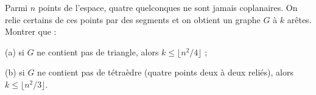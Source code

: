 Parmi $n$ points de l'espace, quatre quelconques ne sont jamais coplanaires. On relie certains de ces points par des segments et on obtient un graphe $G$ à $k$ arêtes. Montrer que :

(a) si $G$ ne contient pas de triangle, alors $k \leq \lfloor n^2/4 \rfloor$ ;

(b) si $G$ ne contient pas de tétraèdre (quatre points deux à deux reliés), alors $k \leq \lfloor n^2/3 \rfloor$.
